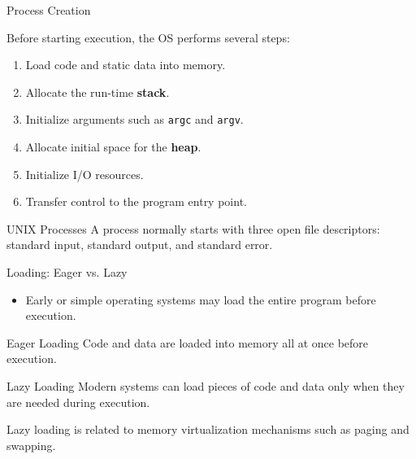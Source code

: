 \begin{frame}{Process Creation}

Before starting execution, the OS performs several steps:

\begin{enumerate}
    \item Load code and static data into memory.
    \item Allocate the run-time \textbf{stack}.
    \item Initialize arguments such as \texttt{argc} and \texttt{argv}.
    \item Allocate initial space for the \textbf{heap}.
    \item Initialize I/O resources.
    \item Transfer control to the program entry point.
\end{enumerate}

\vspace{0.2cm}

\begin{block}{UNIX Processes}
A process normally starts with three open file descriptors:
standard input, standard output, and standard error.
\end{block}

\end{frame}

\begin{frame}{Loading: Eager vs. Lazy}

\begin{itemize}
    \item Early or simple operating systems may load the entire program
          before execution.
\end{itemize}

\begin{block}{Eager Loading}
Code and data are loaded into memory all at once before execution.
\end{block}

\begin{block}{Lazy Loading}
Modern systems can load pieces of code and data only when they
are needed during execution.
\end{block}

\vspace{0.2cm}

Lazy loading is related to memory virtualization mechanisms such as
paging and swapping.

\end{frame}

